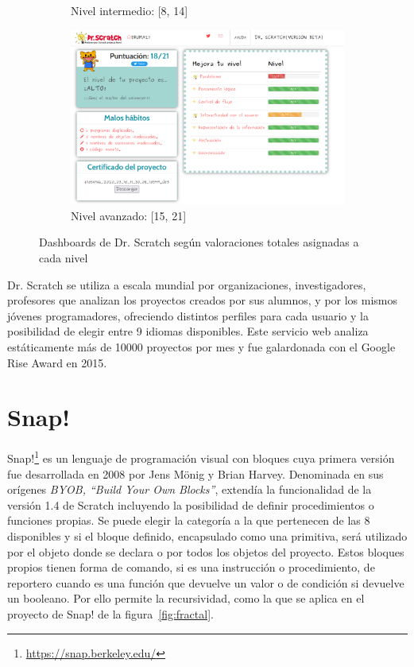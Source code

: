 \documentclass[a4paper, 12pt]{book}
\begin{document}
\begin{figure}[H]
\begin{subfigure}[h]{.325\textwidth}
        \caption{Nivel intermedio: [8, 14]}
    \end{subfigure}
    \begin{subfigure}[h]{.325\textwidth} 
        \includegraphics[width=\textwidth]{img/alto_Scratch}
        \caption{Nivel avanzado: [15, 21]}
    \end{subfigure}
    \caption{Dashboards de Dr. Scratch según valoraciones totales asignadas a cada nivel}
    \label{fig:dashboards}
\end{figure}

Dr. Scratch se utiliza a escala mundial por organizaciones, investigadores, profesores que analizan los proyectos creados por sus alumnos, y por los mismos jóvenes programadores, ofreciendo distintos perfiles para cada usuario y la posibilidad de elegir entre 9 idiomas disponibles. Este servicio web analiza estáticamente más de 10000 proyectos por mes y fue galardonada con el Google Rise Award en 2015. %

\section{Snap!}
\label{sec:snap}

Snap!\footnote{\url{https://snap.berkeley.edu/}} es un lenguaje de programación visual con bloques cuya primera versión fue desarrollada en 2008 por Jens Mönig y Brian Harvey. Denominada en sus orígenes \emph{BYOB, ``Build Your Own Blocks''}, extendía la funcionalidad de la versión 1.4 de Scratch incluyendo la posibilidad de definir procedimientos o funciones propias. Se puede elegir la categoría a la que pertenecen de las 8 disponibles y si el bloque definido, encapsulado como una primitiva, será utilizado por el objeto donde se declara o por todos los objetos del proyecto.
Estos bloques propios tienen forma de comando, si es una instrucción o procedimiento, de reportero cuando es una función que devuelve un valor o de condición si devuelve un booleano. Por ello permite la recursividad, como la que se aplica en el proyecto de Snap! de la figura~\ref{fig:fractal}.
\end{document}
